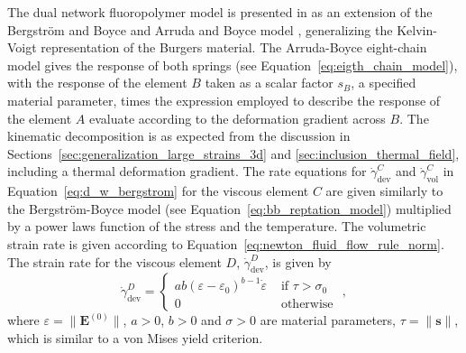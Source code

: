The dual network fluoropolymer model is presented in \cite{bergstromConstitutiveModelPredicting2005} as an extension of the Bergström and Boyce \citep{bergstromConstitutiveModelingLarge1998} and Arruda and Boyce model \citep{arrudaEffectsStrainRate1995}, generalizing the Kelvin-Voigt representation of the Burgers material.
The Arruda-Boyce eight-chain model gives the response of both springs (see Equation~\eqref{eq:eigth_chain_model}), with the response of the element $B$ taken as a scalar factor $s_B$, a specified material parameter, times the expression employed to describe the response of the element $A$ evaluate according to the deformation gradient across $B$.
The kinematic decomposition is as expected from the discussion in Sections~\ref{sec:generalization_large_strains_3d} and \ref{sec:inclusion_thermal_field}, including a thermal deformation gradient.
The rate equations for $\dot\gamma^C_\text{dev}$ and $\dot\gamma^C_\text{vol}$ in Equation~\eqref{eq:d_w_bergstrom} for the viscous element $C$ are given similarly to the Bergström-Boyce model (see Equation~\eqref{eq:bb_reptation_model}) multiplied by a power laws function of the stress and the temperature.
The volumetric strain rate is given according to Equation~\eqref{eq:newton_fluid_flow_rule_norm}.
The strain rate for the viscous element $D$, $\dot \gamma^D_\text{dev}$, is given by
\begin{equation}
	\dot{\gamma}_\text{dev}^D=\begin{cases}
	a b\left(\varepsilon-\varepsilon_0\right)^{b-1} \dot{\varepsilon} & \text { if } \tau>\sigma_0 \\
	0 & \text { otherwise }
	\end{cases},
\end{equation}
where $\varepsilon = \|\mathbf E^{(0)}\|$, $a >0$, $b>0$ and $\sigma>0$ are material parameters, $\tau = \|\mathbf s\|$, which is similar to a von Mises yield criterion.

